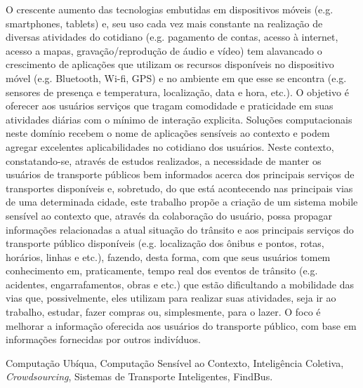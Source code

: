 O crescente aumento das tecnologias embutidas em dispositivos móveis (e.g. smartphones, tablets) e, seu uso cada vez mais constante na realização de diversas atividades do cotidiano (e.g. pagamento de contas, acesso à internet, acesso a mapas, gravação/reprodução de áudio e vídeo) tem alavancado o crescimento de aplicações que utilizam os recursos disponíveis no dispositivo móvel (e.g. Bluetooth, Wi-fi, GPS) e no ambiente em que esse se encontra (e.g. sensores de presença e temperatura, localização, data e hora, etc.). O objetivo é oferecer aos usuários serviços que tragam comodidade e praticidade em suas atividades diárias com o mínimo de interação explicita. Soluções computacionais neste domínio recebem o nome de aplicações sensíveis ao contexto e podem agregar excelentes aplicabilidades no cotidiano dos usuários. Neste contexto, constatando-se, através de estudos realizados, a necessidade de manter os usuários de transporte públicos bem informados acerca dos principais serviços de transportes disponíveis e, sobretudo, do que está acontecendo nas principais vias de uma determinada cidade,  este trabalho propõe a criação de um sistema mobile sensível ao contexto que, através da colaboração do usuário, possa propagar informações relacionadas a atual situação do trânsito e aos principais serviços do transporte público disponíveis (e.g. localização dos ônibus e pontos, rotas, horários, linhas e etc.), fazendo, desta forma, com que seus usuários tomem conhecimento em, praticamente, tempo real dos eventos de trânsito (e.g. acidentes, engarrafamentos, obras e etc.) que estão dificultando a mobilidade das vias que, possivelmente, eles utilizam para realizar suas atividades, seja ir ao trabalho, estudar, fazer compras ou, simplesmente, para o lazer. O foco é melhorar a informação oferecida aos usuários do transporte público, com base em informações fornecidas por outros indivíduos. 


\begin{keywords}
Computação Ubíqua, Computação Sensível ao Contexto, Inteligência Coletiva, \textit{Crowdsourcing}, Sistemas de Transporte Inteligentes, FindBus. 

\end{keywords}